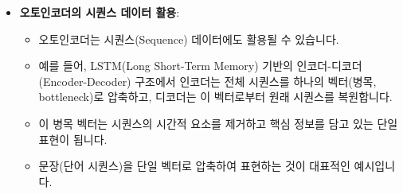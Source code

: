 \documentclass[11pt,a4paper]{article}
\begin{document}
\begin{itemize}
\begin{itemize}
        \item \textbf{단계 1}: 첫 번째 은닉층과 출력층만으로 구성된 얕은 오토인코더를 훈련합니다.
        \item \textbf{단계 2}: 첫 번째 층의 가중치(coefficients)를 고정(freeze)하고, 두 번째 은닉층을 추가하여 중간 부분을 훈련합니다.
        \item 이 과정을 반복하여 각 층을 순차적으로 훈련할 수 있습니다.
        \item 과거에는 각 층의 가중치 스케일이 달라 경사 하강법(gradient descent)의 수렴이 어려울 수 있었기 때문에 이러한 단계별 훈련 방식이 선호되었습니다.
        \item \textbf{가중치 스케일 문제}: 서로 다른 층의 가중치들이 매우 다른 스케일을 가질 경우, 경사 하강법이 최적점으로 수렴하지 못하고 발산하거나 매우 느리게 수렴할 수 있습니다. 이는 손실 함수의 등고선이 매우 길쭉한 형태를 띠게 되어, 경사 벡터가 최적점 방향이 아닌 다른 방향을 가리키기 때문입니다.
        \item \textbf{해결책}:
        \begin{itemize}
            \item \textbf{Adam 옵티마이저 (Adam Optimizer)}: 지역 곡률(local curvature)에 따라 학습률(learning rate)을 조절하여 경사 벡터의 방향을 효과적으로 조정합니다.
            \item \textbf{배치 정규화 (Batch Normalization)}: 각 층의 입력 신호를 정규화하여 가중치 스케일 문제를 완화합니다.
            \item \textbf{숏컷 연결 (Shortcut Connections)}: 일부 층을 건너뛰어 신호가 직접 전달되도록 하여, 신호 스케일 문제를 줄입니다.
        \end{itemize}
        \item 이러한 기술들 덕분에 오늘날에는 스택 오토인코더의 모든 층을 한 번에 훈련하는 것이 일반적입니다. 하지만 단계별 훈련 방식도 여전히 유효한 접근법입니다.
    \end{itemize}
    \item \textbf{오토인코더의 시퀀스 데이터 활용}:
    \begin{itemize}
        \item 오토인코더는 시퀀스(Sequence) 데이터에도 활용될 수 있습니다.
        \item 예를 들어, LSTM(Long Short-Term Memory) 기반의 인코더-디코더(Encoder-Decoder) 구조에서 인코더는 전체 시퀀스를 하나의 벡터(병목, bottleneck)로 압축하고, 디코더는 이 벡터로부터 원래 시퀀스를 복원합니다.
        \item 이 병목 벡터는 시퀀스의 시간적 요소를 제거하고 핵심 정보를 담고 있는 단일 표현이 됩니다.
        \item 문장(단어 시퀀스)을 단일 벡터로 압축하여 표현하는 것이 대표적인 예시입니다.
    \end{itemize}
\end{itemize}
\end{document}

